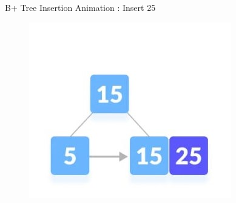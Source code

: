 \documentclass{beamer}
\begin{document}
\begin{frame}{B+ Tree Insertion Animation : \alert{Insert 25}}
\begin{table}[h]
\begin{overprint}
\begin{figure}
        \end{figure}
        \begin{figure}
            \centering
            \includegraphics[scale=0.8]{Images/bi3_2_2.jpg}
        \end{figure}
        \end{overprint}
    \end{table} 
\end{frame}
\end{document}
